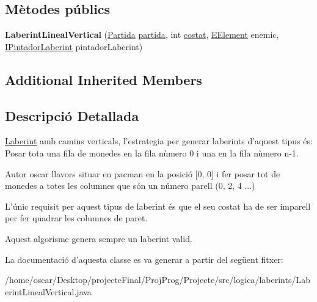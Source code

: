 \subsection*{Mètodes públics}
\begin{DoxyCompactItemize}
\item 
\hypertarget{classlogica_1_1laberints_1_1_laberint_lineal_vertical_a98a5be8e42c30d6f6ad03e5c1e635c4b}{{\bfseries Laberint\+Lineal\+Vertical} (\hyperlink{classlogica_1_1_partida}{Partida} \hyperlink{classlogica_1_1laberints_1_1_laberint_a7183ce070714f73e078bb36e8c21b575}{partida}, int \hyperlink{classlogica_1_1laberints_1_1_laberint_ae874ac4889592b811709f5b967d85286}{costat}, \hyperlink{enumlogica_1_1enumeracions_1_1_e_element}{E\+Element} enemic, \hyperlink{interfaceinterficie_1_1_i_pintador_laberint}{I\+Pintador\+Laberint} pintador\+Laberint)}\label{classlogica_1_1laberints_1_1_laberint_lineal_vertical_a98a5be8e42c30d6f6ad03e5c1e635c4b}

\end{DoxyCompactItemize}
\subsection*{Additional Inherited Members}


\subsection{Descripció Detallada}
\hyperlink{classlogica_1_1laberints_1_1_laberint}{Laberint} amb camins verticals, l'estrategia per generar laberints d'aquest tipus és\+: Posar tota una fila de monedes en la fila nùmero 0 i una en la fila nùmero n-\/1. 

\begin{DoxyAuthor}{Autor}
oscar llavors situar en pacman en la posició \mbox{[}0, 0\mbox{]} i fer posar tot de monedes a totes les columnes que són un número parell (0, 2, 4 ...)
\end{DoxyAuthor}
L'únic requisit per aquest tipus de laberint és que el seu costat ha de ser imparell per fer quadrar les columnes de paret.

Aquest algorisme genera sempre un laberint valid. 

La documentació d'aquesta classe es va generar a partir del següent fitxer\+:\begin{DoxyCompactItemize}
\item 
/home/oscar/\+Desktop/projecte\+Final/\+Proj\+Prog/\+Projecte/src/logica/laberints/Laberint\+Lineal\+Vertical.\+java\end{DoxyCompactItemize}
